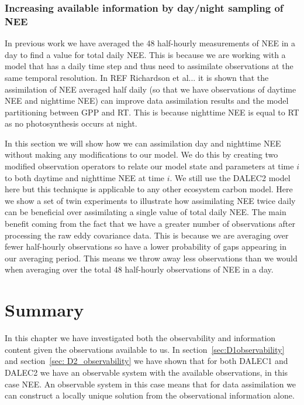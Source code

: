 \documentclass[11pt]{article}
\begin{document}
\subsubsection{Increasing available information by day/night sampling of NEE}

In previous work we have averaged the 48 half-hourly measurements of NEE in a day to find a value for total daily NEE. This is because we are working with a model that has a daily time step and thus need to assimilate observations at the same temporal resolution. In REF Richardson et al... it is shown that the assimilation of NEE averaged half daily (so that we have observations of daytime NEE and nighttime NEE) can improve data assimilation results and the model partitioning between GPP and RT. This is because nighttime NEE is equal to RT as no photosynthesis occurs at night.

In this section we will show how we can assimilation day and nighttime NEE without making any modifications to our model. We do this by creating two modified observation operators to relate our model state and parameters at time \(i\) to both daytime and nighttime NEE at time \(i\). We still use the DALEC2 model here but this technique is applicable to any other ecosystem carbon model. Here we show a set of twin experiments to illustrate how assimilating NEE twice daily can be beneficial over assimilating a single value of total daily NEE. The main benefit coming from the fact that we have a greater number of observations after processing the raw eddy covariance data. This is because we are averaging over fewer half-hourly observations so have a lower probability of gaps appearing in our averaging period. This means we throw away less observations than we would when averaging over the total 48 half-hourly observations of NEE in a day.

\section{Summary}

In this chapter we have investigated both the observability and information content given the observations available to us. In section~\ref{sec:D1observability} and section~\ref{sec: D2_observability} we have shown that for both DALEC1 and DALEC2 we have an observable system with the available observations, in this case NEE. An observable system in this case means that for data assimilation we can construct a locally unique solution from the observational information alone. 
\end{document}
